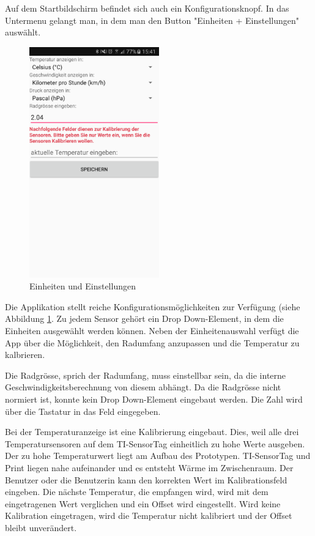 Auf dem Startbildschirm befindet sich auch ein Konfigurationsknopf. In das Untermenu gelangt man, in dem man den Button "Einheiten + Einstellungen" auswählt.

\begin{figure}[ht]
    \includegraphics[width=0.5\textwidth]{4Resultate/imag/BLEEinheitenUndEinstellungenStart.png} 
    \caption{Einheiten und Einstellungen}
    \label{einheiten}
\end{figure}

Die Applikation stellt reiche Konfigurationsmöglichkeiten zur Verfügung (siehe Abbildung \ref{einheiten}. Zu jedem Sensor gehört ein Drop Down-Element, in dem die Einheiten ausgewählt werden können. Neben der Einheitenauswahl verfügt die App über die Möglichkeit, den Radumfang anzupassen und die Temperatur zu kalbrieren. 

Die Radgrösse, sprich der Radumfang, muss einstellbar sein, da die interne Geschwindigkeitsberechnung von diesem abhängt. Da die Radgrösse nicht normiert ist, konnte kein Drop Down-Element eingebaut werden. Die Zahl wird über die Tastatur in das Feld eingegeben.

Bei der Temperaturanzeige ist eine Kalibrierung eingebaut. Dies, weil alle drei Temperatursensoren auf dem TI-SensorTag einheitlich zu hohe Werte ausgeben. Der zu hohe Temperaturwert liegt am Aufbau des Prototypen. TI-SensorTag und Print liegen nahe aufeinander und es entsteht Wärme im Zwischenraum. Der Benutzer oder die Benutzerin kann den korrekten Wert im Kalibrationsfeld eingeben. Die nächste Temperatur, die empfangen wird, wird mit dem eingetragenen Wert verglichen und ein Offset wird eingestellt. Wird keine Kalibration eingetragen, wird die Temperatur nicht kalibriert und der Offset bleibt unverändert.

